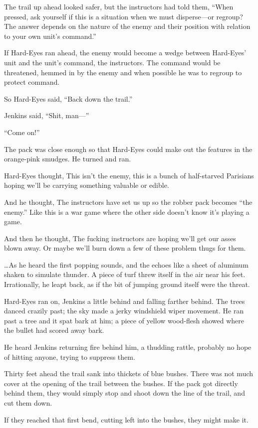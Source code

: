 The trail up ahead looked safer, but the instructors had told them, ``When pressed, ask yourself if this is a situation when we must disperse---or regroup? The answer depends on the nature of the enemy and their position with relation to your own unit's command.''

If Hard-Eyes ran ahead, the enemy would become a wedge between Hard-Eyes' unit and the unit's command, the instructors. The command would be threatened, hemmed in by the enemy and when possible he was to regroup to protect command.

So Hard-Eyes said, ``Back down the trail.''

Jenkins said, ``Shit, man---''

``Come on!''

The pack was close enough so that Hard-Eyes could make out the features in the orange-pink smudges. He turned and ran.

Hard-Eyes thought, This isn't the enemy, this is a bunch of half-starved Parisians hoping we'll be carrying something valuable or edible.

And he thought, The instructors have set us up so the robber pack becomes ``the enemy.'' Like this is a war game where the other side doesn't know it's playing a game.

And then he thought, The fucking instructors are hoping we'll get our asses blown away. Or maybe we'll burn down a few of these problem thugs for them.

\ldots As he heard the first popping sounds, and the echoes like a sheet of aluminum shaken to simulate thunder. A piece of turf threw itself in the air near his feet. Irrationally, he leapt back, as if the bit of jumping ground itself were the threat.

Hard-Eyes ran on, Jenkins a little behind and falling farther behind. The trees danced crazily past; the sky made a jerky windshield wiper movement. He ran past a tree and it spat bark at him; a piece of yellow wood-flesh showed where the bullet had scored away bark.

He heard Jenkins returning fire behind him, a thudding rattle, probably no hope of hitting anyone, trying to suppress them.

Thirty feet ahead the trail sank into thickets of blue bushes. There was not much cover at the opening of the trail between the bushes. If the pack got directly behind them, they would simply stop and shoot down the line of the trail, and cut them down.

If they reached that first bend, cutting left into the bushes, they might make it.

